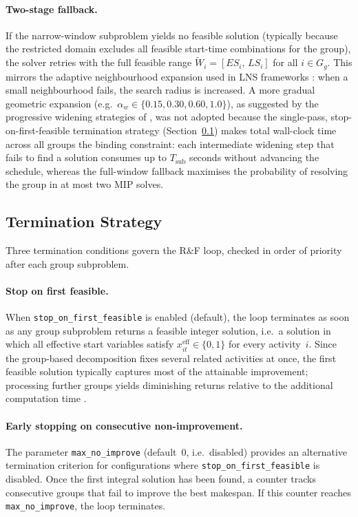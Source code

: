 \paragraph{Two-stage fallback.}
If the narrow-window subproblem yields no feasible solution
(typically because the restricted domain excludes all feasible
start-time combinations for the group), the solver retries
with the full feasible range $\widetilde{W}_i = [ES_i,\, LS_i]$
for all $i \in G_g$. This mirrors the adaptive neighbourhood
expansion used in LNS frameworks \parencite{Ropke2006}: when a
small neighbourhood fails, the search radius is increased.
A more gradual geometric expansion (e.g.\
$\alpha_w \in \{0.15, 0.30, 0.60, 1.0\}$), as suggested by the
progressive widening strategies of \textcite{Helber2010}, was not
adopted because the single-pass, stop-on-first-feasible
termination strategy
(Section~\ref{subsec:stopping}) makes total wall-clock time
across all groups the binding constraint: each intermediate
widening step that fails to find a solution consumes up to
$T_{\mathrm{sub}}$ seconds without advancing the schedule,
whereas the full-window fallback maximises the probability of
resolving the group in at most two MIP solves.

\subsection{Termination Strategy}
\label{subsec:stopping}
Three termination conditions govern the R\&F loop, checked in
order of priority after each group subproblem.

\paragraph{Stop on first feasible.}
When \texttt{stop\_on\_first\_feasible} is enabled (default), the
loop terminates as soon as any group subproblem returns a feasible
integer solution, i.e.\ a solution in which all effective start
variables satisfy $x^{\mathrm{eff}}_{it} \in \{0, 1\}$ for every
activity~$i$. Since the group-based decomposition fixes several related
activities at once, the first feasible solution typically
captures most of the attainable improvement; processing
further groups yields diminishing returns relative to the
additional computation time \parencite{pochet2006}.

\paragraph{Early stopping on consecutive non-improvement.}
The parameter \texttt{max\_no\_improve} (default~$0$, i.e.\
disabled) provides an alternative termination criterion for
configurations where \texttt{stop\_on\_first\_feasible} is
disabled. Once the first integral solution has been found, a
counter tracks consecutive groups that fail to improve the best
makespan. If this counter reaches \texttt{max\_no\_improve}, the
loop terminates.

